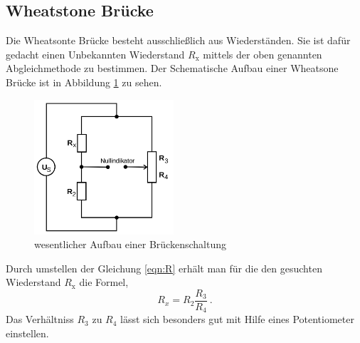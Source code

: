 \subsection{Wheatstone Brücke}
Die Wheatsonte Brücke besteht ausschließlich aus Wiederständen. Sie ist dafür gedacht einen Unbekannten Wiederstand $R_\text{x}$ mittels der oben genannten Abgleichmethode zu bestimmen. Der Schematische Aufbau einer Wheatsone Brücke ist in Abbildung \ref{fig:widerstand} zu sehen.
\begin{figure}
      \centering
      \includegraphics[height=5cm]{picture/2.png}
      \caption{wesentlicher Aufbau einer Brückenschaltung \cite{sample}}
      \label{fig:widerstand}
\end{figure}
Durch umstellen der Gleichung \ref{eqn:R} erhält man für die den gesuchten Wiederstand $R_\text{x}$ die Formel,
\begin{equation}
  R_x = R_2 \frac{R_3}{R_4} \ .
  \label{eqn:R_x}
\end{equation}
Das Verhältniss $R_3$ zu $R_4$ lässt sich besonders gut mit Hilfe eines Potentiometer einstellen.
